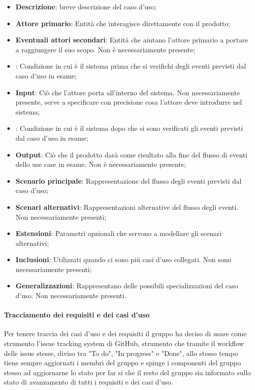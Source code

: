 \documentclass[../norme_di_progetto.tex]{subfiles}
\begin{document}
\begin{itemize}
    \item \textbf{Descrizione}: breve descrizione del caso d'uso;
    \item \textbf{Attore primario}: Entità che interagisce direttamente con il prodotto;
    \item \textbf{Eventuali attori secondari}: Entità che aiutano l'attore primario a portare a raggiungere il suo scopo. Non è necessariamente presente;
    \item {}: Condizione in cui è il sistema prima che si verifichi degli eventi previsti dal caso d'uso in esame;
    \item \textbf{Input}: Ciò che l'attore porta all'interno del sistema. Non necessariamente presente, serve a specificare con precisione cosa l'attore deve introdurre nel sistema;
    \item {}: Condizione in cui è il sistema dopo che si sono verificati gli eventi previsti dal caso d'uso in esame;
    \item \textbf{Output}: Ciò che il prodotto darà come risultato alla fine del flusso di eventi dello use case in esame. Non è necessariamente presente;
    \item \textbf{Scenario principale}: Rappresentazione del flusso degli eventi previsti dal caso d'uso;
    \item \textbf{Scenari alternativi}: Rappresentazioni alternative del flusso degli eventi. Non necessariamente presenti;
    \item \textbf{Estensioni}: Parametri opzionali che servono a modellare gli scenari alternativi;
    \item \textbf{Inclusioni}: Utilizzati quando ci sono più casi d'uso collegati. Non sono necessariamente presenti;
    \item \textbf{Generalizzazioni}: Rappresentano delle possibili specializzazioni del caso d'uso. Non necessariamente presenti.
\end{itemize}

\paragraph{Tracciamento dei requisiti e dei casi d'uso}
Per tenere traccia dei casi d'uso e dei requisiti il gruppo ha deciso di usare come strumento l'issue tracking system di GitHub, strumento che tramite il workflow delle issue stesse, diviso tra "To do", "In progress" e "Done", allo stesso tempo tiene sempre aggiornati i membri del gruppo e spinge i componenti del gruppo stesso ad aggiornarne lo stato per far si che il resto del gruppo sia informato sullo stato di avanzamento di tutti i requisiti e dei casi d'uso.
\end{document}
